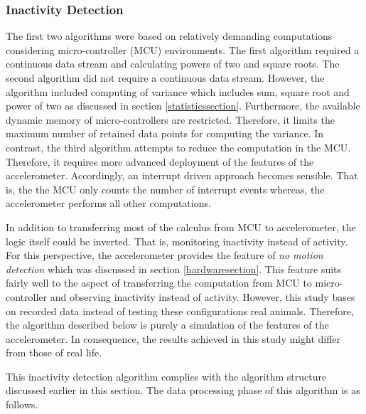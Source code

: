 \documentclass[english,12pt,a4paper,pdftex,elec,utf8]{aaltothesis}
\begin{document}
\subsubsection{Inactivity Detection} \label{inactivitydetectionsection}

The first two algorithms were based on relatively demanding computations considering micro-controller (MCU) environments. The first algorithm required a continuous data stream and calculating powers of two and square roots. The second algorithm did not require a continuous data stream. However, the algorithm included computing of variance which includes sum, square root and power of two as discussed in section \ref{statisticssection}. Furthermore, the available dynamic memory of micro-controllers are restricted. Therefore, it limits the maximum number of retained data points for computing the variance. In contrast, the third algorithm attempts to reduce the computation in the MCU. Therefore, it requires more advanced deployment of the features of the accelerometer. Accordingly, an interrupt driven approach becomes sensible. That is, the the MCU only counts the number of interrupt events whereas, the accelerometer performs all other computations. 

In addition to transferring most of the calculus from MCU to accelerometer, the logic itself could be inverted. That is, monitoring inactivity instead of activity. For this perspective, the accelerometer provides the feature of \textit{no motion detection} which was discussed in section \ref{hardwaresection}. This feature suits fairly well to the aspect of transferring the computation from MCU to micro-controller and observing inactivity instead of activity. However, this study bases on recorded data instead of testing these configurations real animals. Therefore, the algorithm described below is purely a simulation of the features of the accelerometer. In consequence, the results achieved in this study might differ from those of real life. 

This inactivity detection algorithm complies with the algorithm structure discussed earlier in this section. The data processing phase of this algorithm is as follows. 
\end{document}
